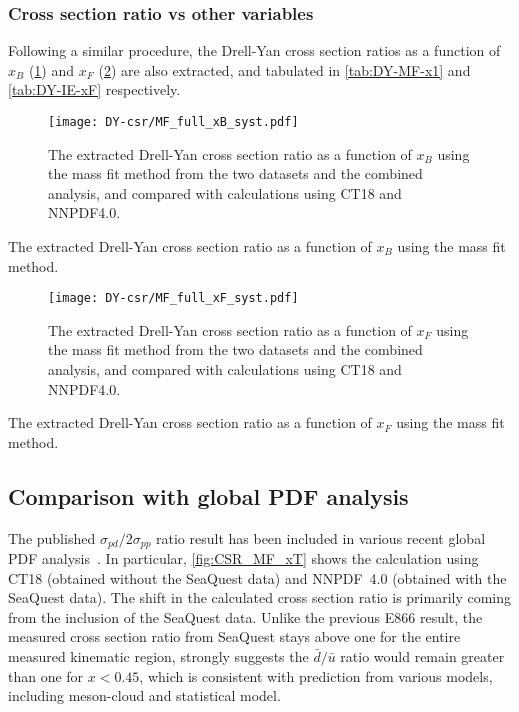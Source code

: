 \documentclass[../main.tex]{subfiles}
\begin{document}
\subsubsection{Cross section ratio vs other variables}
Following a similar procedure, the Drell-Yan cross section ratios as a function of $x_B$ (\cref{fig:CSR_MF_xB})
and $x_F$ (\cref{fig:CSR_MF_xF}) are also extracted, and tabulated in \cref{tab:DY-MF-x1} and \cref{tab:DY-IE-xF} respectively.
\begin{figure}[h!]
	\centering
	\texttt{[image: DY-csr/MF\_full\_xB\_syst.pdf]}
	\caption{The extracted Drell-Yan cross section ratio as a function of $x_B$
		using the mass fit method from the two datasets and the combined analysis,
		and compared with calculations using CT18 and NNPDF4.0.}
	\label{fig:CSR_MF_xB}
\end{figure}
\begin{table}[h!]
	\centering
	\caption{The extracted Drell-Yan cross section ratio as a function of $x_B$ using the mass fit method.}
	\label{tab:DY-MF-x1}
	
\end{table}
\begin{figure}[h!]
	\centering
	\texttt{[image: DY-csr/MF\_full\_xF\_syst.pdf]}
	\caption{The extracted Drell-Yan cross section ratio as a function of $x_F$
		using the mass fit method from the two datasets and the combined analysis,
		and compared with calculations using CT18 and NNPDF4.0.}
	\label{fig:CSR_MF_xF}
\end{figure}
\begin{table}[h!]
	\centering
	\caption{The extracted Drell-Yan cross section ratio as a function of $x_F$ using the mass fit method.}
	\label{tab:DY-MF-xF}
	
\end{table}
\FloatBarrier

\subsection{Comparison with global PDF analysis}
The published $\sigma_{pd}/2\sigma_{pp}$ ratio result has been included in various recent global
PDF analysis~\cite{cocuzza2021,guzzi2022,accardi2023,alekhin2023}.
In particular, \cref{fig:CSR_MF_xT} shows the calculation using CT18 (obtained without the SeaQuest data)
and NNPDF~4.0 (obtained with the SeaQuest data). The shift in the calculated cross section ratio is primarily
coming from the inclusion of the SeaQuest data. Unlike the previous E866 result, the measured cross section ratio
from SeaQuest stays above one for the entire measured kinematic region,
strongly suggests the $\bar{d}/\bar{u}$ ratio would remain greater than one for $x<0.45$, which is
consistent with prediction from various models, including meson-cloud and statistical model.
\end{document}
